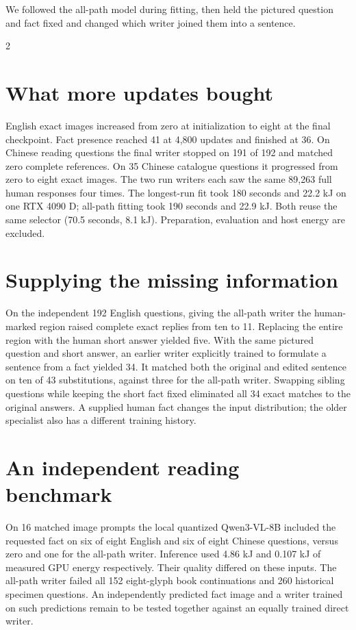 \newpage
{}
\noindent We followed the all-path model during fitting, then held the pictured question and fact fixed and changed which writer joined them into a sentence.
\begin{multicols}{2}
\section*{What more updates bought}
English exact images increased from zero at initialization to eight at the final checkpoint. Fact presence reached 41 at 4,800 updates and finished at 36. On Chinese reading questions the final writer stopped on 191 of 192 and matched zero complete references. On 35 Chinese catalogue questions it progressed from zero to eight exact images. The two run writers each saw the same 89,263 full human responses four times. The longest-run fit took 180 seconds and 22.2 kJ on one RTX 4090 D; all-path fitting took 190 seconds and 22.9 kJ. Both reuse the same selector (70.5 seconds, 8.1 kJ). Preparation, evaluation and host energy are excluded.
\section*{Supplying the missing information}
On the independent 192 English questions, giving the all-path writer the human-marked region raised complete exact replies from ten to 11. Replacing the entire region with the human short answer yielded five. With the same pictured question and short answer, an earlier writer explicitly trained to formulate a sentence from a fact yielded 34. It matched both the original and edited sentence on ten of 43 substitutions, against three for the all-path writer. Swapping sibling questions while keeping the short fact fixed eliminated all 34 exact matches to the original answers. A supplied human fact changes the input distribution; the older specialist also has a different training history.
\section*{An independent reading benchmark}
On 16 matched image prompts the local quantized Qwen3-VL-8B included the requested fact on six of eight English and six of eight Chinese questions, versus zero and one for the all-path writer. Inference used 4.86 kJ and 0.107 kJ of measured GPU energy respectively. Their quality differed on these inputs. The all-path writer failed all 152 eight-glyph book continuations and 260 historical specimen questions. An independently predicted fact image and a writer trained on such predictions remain to be tested together against an equally trained direct writer.
\end{multicols}
\newpage
